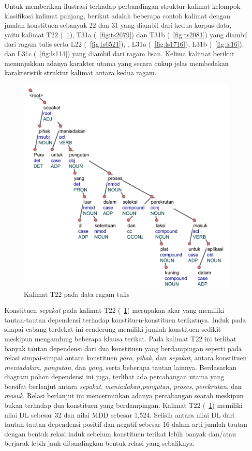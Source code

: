 Untuk memberikan ilustrasi terhadap perbandingan struktur kalimat kelompok klasifikasi kalimat panjang, berikut adalah beberapa contoh kalimat dengan jumlah konstituen sebanyak 22 dan 31 yang diambil dari kedua korpus data, yaitu kalimat T22 (\pic~\ref{fig:ts3901}), T31a (\pic~\ref{fig:ts2079}) dan T31b (\pic~\ref{fig:ts2081}) yang diambil dari ragam tulis serta L22 (\pic~\ref{fig:ls6521}), , L31a (\pic~\ref{fig:ls1716}), L31b (\pic~\ref{fig:ls16}), dan L31c (\pic~\ref{fig:ls114}) yang diambil dari ragam lisan. Kelima kalimat berikut menunjukkan adanya karakter utama yang secara cukup jelas membedakan karakteristik struktur kalimat antara kedua ragam. 

\begin{figure}
	\centering \includegraphics[width=0.8
	\textwidth] {pics/ts3901.jpg} 
	\caption{Kalimat T22 pada data ragam tulis} 
	\label{fig:ts3901} 
\end{figure}

Konstituen \textit{sepakat} pada kalimat T22 (\pic~\ref{fig:ts3901}) merupakan akar yang memiliki tautan-tautan dependensi terhadap konstituen-konstituen terikatnya. Induk pada simpai cabang terdekat ini cenderung memiliki jumlah konstituen sedikit meskipun mengandung beberapa klausa terikat. Pada kalimat T22 ini terlihat banyak tautan dependensi dari dua konstituen yang berdampingan seperti pada relasi simpai-simpai antara konstituen \textit{para}, \textit{pihak}, dan \textit{sepakat}, antara konstituen \textit{meniadakan}, \textit{pungutan}, dan \textit{yang}, serta beberapa tautan lainnya. Berdasarkan diagram pohon dependensi ini juga, terlihat ada percabangan utama yang bersifat berlanjut antara \textit{sepakat}, \textit{meniadakan},\textit{pungutan}, \textit{proses}, \textit{perekrutan}, dan \textit{masuk}. Relasi berlanjut ini mencerminkan adanya percabangan searah meskipun bukan terhadap dua konstituen yang berdampingan. Kalimat T22 (\pic~\ref{fig:ts3901}) memiliki nilai DL sebesar 32 dan nilai MDD sebesar 1,524. Selisih antara nilai DL dari tautan-tautan dependensi positif dan negatif sebesar 16 dalam arti jumlah tautan dengan bentuk relasi induk sebelum konstituen terikat lebih banyak dan/atau berjarak lebih jauh dibandingkan bentuk relasi yang sebaliknya.


